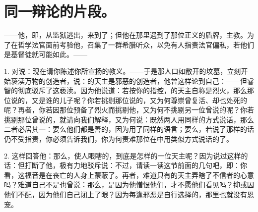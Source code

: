 
\section{同一辩论的片段。}

——他，即，从监狱逃出，来到了；但他在那里遇到了那位正义的盾牌，主教。为了在哲学法官面前考验他，召集了一群希腊听众，以免有人指责法官偏私，若他们是基督徒就可能如此。——\par

1. 对说：现在请你陈述你所宣扬的教义。——于是那人口如敞开的坟墓，立刻开始亵渎万物的创造者，说：的天主是邪恶的创造者，他曾这样论到自己：——但睿智的彻底驳斥了这亵渎。因为他说道：若按你的指控，的天主自称是烈火，那么那位说的，又是谁的儿子呢？你若挑剔那位说的，又为何尊崇曾复活、却也处死的呢？再者，你若因那位预备了烈火而挑剔他，又为何不挑剔另一位曾说的呢？你若挑剔那位曾说的，就请向我们解释，又为何说：既然两人用同样的方式说话，那么二者必居其一：要么他们都是善的，因为用了同样的语言；要么，若说了那样的话仍不受指责，你必须告诉我们，你为何责难那位在中用类似方式说话的了。\par

2. 这样回答他：那么，使人眼瞎的，到底是怎样的一位天主呢？因为说过这样的话：但打断了他，极有力地驳斥说：不过，请读一读这节前面的几句吧，即：你看，这福音是在丧亡的人身上蒙蔽了。再者，难道只有的天主弄瞎了不信者的心意吗？难道自己不是也曾说：那么，是因为他憎恨他们，才不愿他们看见吗？抑或因他们不配，因为他们自己闭上了眼？因为每逢邪恶是自行选择的，那里也就没有恩宠。\par

